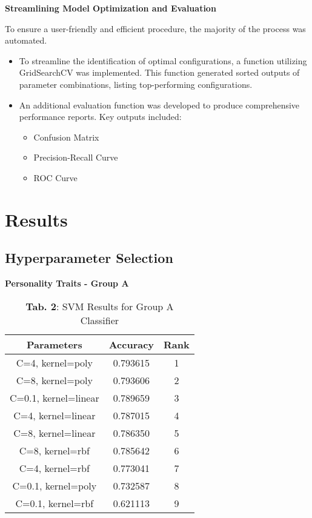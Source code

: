 \documentclass{article}
\begin{document}
\textbf{Streamlining Model Optimization and Evaluation}

To ensure a user-friendly and efficient procedure, the majority of the process was automated.

\begin{itemize} \item To streamline the identification of optimal configurations, a function utilizing GridSearchCV was implemented. This function generated sorted outputs of parameter combinations, listing top-performing configurations.

\item An additional evaluation function was developed to produce comprehensive performance reports. Key outputs included:
\begin{itemize}
    \item Confusion Matrix
    \item Precision-Recall Curve
    \item ROC Curve
\end{itemize}


\end{itemize}


\newpage

\section{Results}

\subsection{Hyperparameter Selection}

\textbf{Personality Traits - Group A}
\vspace{0.5cm}
\begin{table}[h!]
\centering
\begin{tabular}{|c|c|c|}
\hline
\textbf{Parameters}          & \textbf{Accuracy} & \textbf{Rank} \\ \hline
C=4, kernel=poly             & 0.793615          & 1             \\ \hline
C=8, kernel=poly             & 0.793606          & 2             \\ \hline
C=0.1, kernel=linear         & 0.789659          & 3             \\ \hline
C=4, kernel=linear           & 0.787015          & 4             \\ \hline
C=8, kernel=linear           & 0.786350          & 5             \\ \hline
C=8, kernel=rbf              & 0.785642          & 6             \\ \hline
C=4, kernel=rbf              & 0.773041          & 7             \\ \hline
C=0.1, kernel=poly           & 0.732587          & 8             \\ \hline
C=0.1, kernel=rbf            & 0.621113          & 9             \\ \hline
\end{tabular}
\caption{\textbf{Tab. 2}: SVM Results for Group A Classifier}
\label{tab:svm_hard_drugs}
\end{table}
\end{document}
